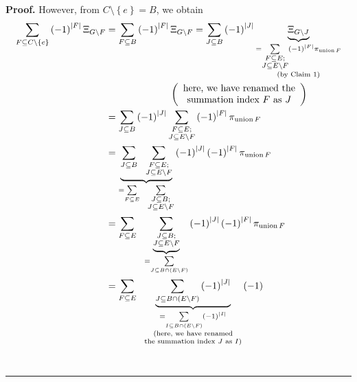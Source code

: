 \documentclass[numbers=enddot,12pt,final,onecolumn,notitlepage]{scrartcl}%
\theoremstyle{definition}
\newenvironment{proof}[1][Proof]{\noindent\textbf{#1.} }{\ \rule{0.5em}{0.5em}}
\newenvironment{verlong}{}{}
\let\sumnonlimits\sum
\renewcommand{\sum}{\sumnonlimits\limits}
\begin{document}
\begin{proof}
\begin{verlong}
However, from $C\setminus\left\{  e\right\}  =B$, we obtain%
\begin{align}
\sum_{F\subseteq C\setminus\left\{  e\right\}  }\left(  -1\right)
^{\left\vert F\right\vert }\Xi_{G\setminus F}  &  =\sum_{F\subseteq B}\left(
-1\right)  ^{\left\vert F\right\vert }\Xi_{G\setminus F}=\sum_{J\subseteq
B}\left(  -1\right)  ^{\left\vert J\right\vert }\underbrace{\Xi_{G\setminus
J}}_{\substack{=\sum_{\substack{F\subseteq E;\\J\subseteq E\setminus
F}}\left(  -1\right)  ^{\left\vert F\right\vert }\pi_{\operatorname*{union}%
F}\\\text{(by Claim 1)}}}\nonumber\\
&  \ \ \ \ \ \ \ \ \ \ \ \ \ \ \ \ \ \ \ \ \left(
\begin{array}
[c]{c}%
\text{here, we have renamed the}\\
\text{summation index }F\text{ as }J
\end{array}
\right) \nonumber\\
&  =\sum_{J\subseteq B}\left(  -1\right)  ^{\left\vert J\right\vert }%
\sum_{\substack{F\subseteq E;\\J\subseteq E\setminus F}}\left(  -1\right)
^{\left\vert F\right\vert }\pi_{\operatorname*{union}F}\nonumber\\
&  =\underbrace{\sum_{J\subseteq B}\ \ \sum_{\substack{F\subseteq
E;\\J\subseteq E\setminus F}}}_{=\sum_{F\subseteq E}\ \ \sum
_{\substack{J\subseteq B;\\J\subseteq E\setminus F}}}\left(  -1\right)
^{\left\vert J\right\vert }\left(  -1\right)  ^{\left\vert F\right\vert }%
\pi_{\operatorname*{union}F}\nonumber\\
&  =\sum_{F\subseteq E}\ \ \underbrace{\sum_{\substack{J\subseteq
B;\\J\subseteq E\setminus F}}}_{\substack{=\sum_{J\subseteq B\cap\left(
E\setminus F\right)  }}}\left(  -1\right)  ^{\left\vert J\right\vert }\left(
-1\right)  ^{\left\vert F\right\vert }\pi_{\operatorname*{union}F}\nonumber\\
&  =\sum_{F\subseteq E}\ \ \underbrace{\sum_{J\subseteq B\cap\left(
E\setminus F\right)  }\left(  -1\right)  ^{\left\vert J\right\vert }%
}_{\substack{=\sum_{I\subseteq B\cap\left(  E\setminus F\right)  }\left(
-1\right)  ^{\left\vert I\right\vert }\\\text{(here, we have renamed}%
\\\text{the summation index }J\text{ as }I\text{)}}}\left(  -1\right)

\end{align}
\end{verlong}
\end{proof}
\end{document}
